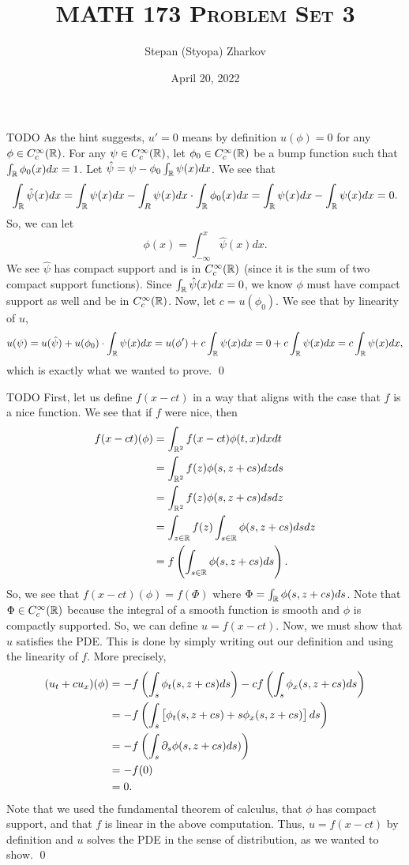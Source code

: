 \documentclass{article}
\title{\textsc{MATH 173 Problem Set 3}}
\author{Stepan (Styopa) Zharkov}
\date{April 20, 2022}
\newcommand{\Cc}{{C_c^\infty(\RR)}}
\renewcommand{\d}{\partial}
\begin{document}
\maketitle
{} TODO \tri
\hop
\solution
As the hint suggests, $u' = 0$ means by definition $u(\phi) = 0$ for any $\phi \in C_c^\infty(\mathbb{R})$. For any $\psi \in \Cc$, let $\phi_0\in \Cc$ be a bump function such that $\int_{\mathbb{R}} \phi_0(x)dx = 1$. Let $\hat{\psi} = \psi - \phi_0\int_{\mathbb{R}}\psi(x)dx$. We see that 
\[\int_{\mathbb{R}} \hat{\psi}(x)dx = \int_{\mathbb{R}} \psi(x)dx -\int_R\psi(x)dx\cdot \int_{\mathbb{R}}\phi_0(x)dx =\int_{\mathbb{R}} \psi(x)dx-\int_{\mathbb{R}} \psi(x)dx = 0.\]
So, we can let 
\[\phi(x) = \int_{-\infty}^x \hat{\psi}(x) dx.\]
We see $\hat{\psi}$ has compact support and is in $\Cc$ (since it is the sum of two compact support functions). Since $\int_{\mathbb{R}} \hat{\psi}(x)dx = 0$, we know $\phi$ must have compact support as well and be in $\Cc$. Now, let $c = u(\phi_0)$. We see that by linearity of $u$,
\[u(\psi) = u(\hat{\psi}) + u(\phi_0)\cdot \int_{\mathbb{R}}\psi(x)dx = u(\phi') + c\int_{\mathbb{R}}\psi(x)dx =0+  c\int_{\mathbb{R}}\psi(x)dx=c\int_{\mathbb{R}}\psi(x)dx, \]
which is exactly what we wanted to prove. 
\qed


\newpage
{}TODO
\tri
\hop
\solution
First, let us define $f(x-ct)$ in a way that aligns with the case that $f$ is a nice function. We see that if $f$ were nice, then
\begin{align*}
    f(x-ct)(\phi)&= \int_{\RR^2}f(x-ct)\phi(t,x)dxdt \\
    &= \int_{\RR^2}f(z)\phi(s,z+cs)dzds \\
    &= \int_{\RR^2}f(z)\phi(s,z+cs)dsdz \\
    & = \int_{z \in \RR} f(z) \int_{s \in \RR} \phi(s,z+cs)ds dz\\
    &= f\del{\int_{s \in \RR}\phi(s,z+cs)ds}. 
\end{align*}
So, we see that $f(x-ct)(\phi) = f(\Phi)$ where $\Phi = \int_{\mathbb{R}} \phi(s,z+cs)ds$. Note that $\Phi \in \Cc$ because the integral of a smooth function is smooth and $\phi$ is compactly supported. So, we can define $u = f(x-ct)$. 
\hop 
Now, we must show that $u$ satisfies the PDE. This is done by simply writing out our definition and using the linearity of $f$. More precisely, 
\begin{align*}
    (u_t + cu_x)(\phi) &= -f\del{\int_s \phi_t(s, z +cs) ds} -cf\del{\int_s \phi_x(s, z +cs) ds} \\
    &= -f\del{\int_s \sbr{\phi_t(s, z +cs) +s\phi_x(s, z +cs)} ds} \\
    & = -f\del{\int_s\d_s \phi(s,z+cs) ds)}\\
    &= -f(0) \\
    &= 0.
\end{align*} 
Note that we used the fundamental theorem of calculus, that $\phi$ has compact support, and that $f$ is linear in the above computation. 
\hop 
Thus, $u = f(x-ct)$ by definition and $u$ solves the PDE in the sense of distribution, as we wanted to show.
\qed
\end{document}
